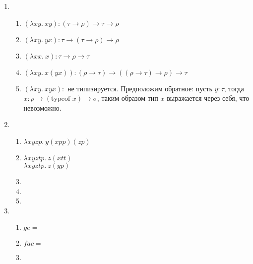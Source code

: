 
\begin{enumerate}
  \item
  \begin{enumerate}
    \item 
      $ (\lambda xy.~xy): (\tau \rightarrow \rho) \rightarrow \tau \rightarrow \rho $
      
    \item
      $ (\lambda xy.~yx): \tau \rightarrow (\tau \rightarrow \rho) \rightarrow \rho $
      
    \item 
      $ (\lambda xx.~x): \tau \rightarrow \rho \rightarrow \tau $
      
    \item
      $ (\lambda xy.~x(yx)): (\rho \rightarrow \tau) \rightarrow ((\rho \rightarrow \tau) \rightarrow \rho) \rightarrow \tau$
      
    \item
      $ (\lambda xy.~xyx): $ не типизируется. Предположим обратное: пусть $y : \tau$, тогда $x: \rho \rightarrow (\text{typeof } x) \rightarrow \sigma$, таким образом тип $x$ выражается через себя, что невозможно.      
  \end{enumerate}
    
  \item
  \begin{enumerate}
    \item
      $ \lambda xyzp.~y(xpp)(zp) $

    \item
      $ \lambda xyztp.~z(xtt) $\\
      $ \lambda xyztp.~z(yp) $
      
    \item

    \item

    \item
  \end{enumerate}
  
  \item
  \begin{enumerate}
    \item
      $ ge = $

    \item
      $ fac = $

    \item
  \end{enumerate}

\end{enumerate}